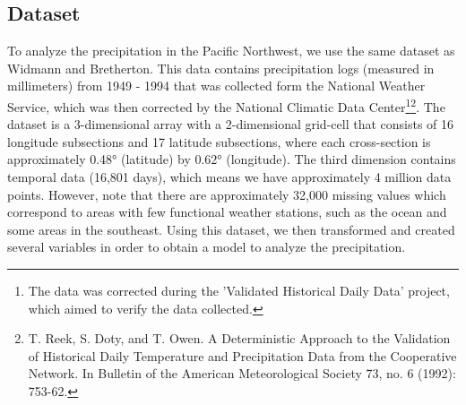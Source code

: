 \documentclass{article}
\begin{document}
\subsection{Dataset}
To analyze the precipitation in the Pacific Northwest, we use the same dataset as Widmann and Bretherton. This data contains precipitation logs (measured in millimeters) from 1949 - 1994 that was collected form the National Weather Service, which was then corrected by the National Climatic Data Center\footnote{The data was corrected during the 'Validated Historical Daily Data' project, which aimed to verify the data collected.}\footnote{T. Reek, S. Doty, and T. Owen. A Deterministic Approach to the Validation of Historical Daily Temperature and Precipitation Data from the Cooperative Network. In Bulletin of the American Meteorological Society 73, no. 6 (1992): 753-62.}. The dataset is a 3-dimensional array with a 2-dimensional grid-cell that consists of 16 longitude subsections and 17 latitude subsections, where each cross-section is approximately \ang{0.48} (latitude) by \ang{0.62} (longitude). The third dimension contains temporal data (16,801 days), which means we have approximately 4 million data points. However, note that there are approximately 32,000 missing values which correspond to areas with few functional weather stations, such as the ocean and some areas in the southeast. Using this dataset, we then transformed and created several variables in order to obtain a model to analyze the precipitation. 
\end{document}
